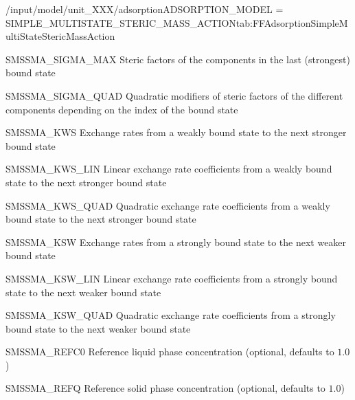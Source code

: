 \begin{condsubgroup}{/input/model/unit\_XXX/adsorption}{ADSORPTION\_MODEL = SIMPLE\_MULTISTATE\_STERIC\_MASS\_ACTION}{tab:FFAdsorptionSimpleMultiStateStericMassAction}
  \begin{dataset}[type = double, range={$\geq 0$}, length={\texttt{NCOMP}}]{SMSSMA\_SIGMA\_MAX} 
    Steric factors of the components in the last (strongest) bound state
  \end{dataset} 
  \begin{dataset}[type = double, range={$\mathds{R}$}, length={\texttt{NCOMP}}]{SMSSMA\_SIGMA\_QUAD} 
    Quadratic modifiers of steric factors of the different components depending on the index of the bound state
  \end{dataset} 
  \begin{dataset}[unit=\si{\per\second}, type = double, range={$\geq 0$}, length={\texttt{NCOMP}}]{SMSSMA\_KWS} 
    Exchange rates from a weakly bound state to the next stronger bound state
  \end{dataset} 
  \begin{dataset}[unit=\si{\per\second}, type = double, range={$\mathds{R}$}, length={\texttt{NCOMP}}]{SMSSMA\_KWS\_LIN} 
    Linear exchange rate coefficients from a weakly bound state to the next stronger bound state
  \end{dataset} 
  \begin{dataset}[unit=\si{\per\second}, type = double, range={$\mathds{R}$}, length={\texttt{NCOMP}}]{SMSSMA\_KWS\_QUAD} 
    Quadratic exchange rate coefficients from a weakly bound state to the next stronger bound state
  \end{dataset} 
  \begin{dataset}[unit=\si{\per\second}, type = double, range={$\geq 0$}, length={\texttt{NCOMP}}]{SMSSMA\_KSW} 
    Exchange rates from a strongly bound state to the next weaker bound state
  \end{dataset} 
  \begin{dataset}[unit=\si{\per\second}, type = double, range={$\mathds{R}$}, length={\texttt{NCOMP}}]{SMSSMA\_KSW\_LIN} 
    Linear exchange rate coefficients from a strongly bound state to the next weaker bound state
  \end{dataset} 
  \begin{dataset}[unit=\si{\per\second}, type = double, range={$\mathds{R}$}, length={\texttt{NCOMP}}]{SMSSMA\_KSW\_QUAD} 
    Quadratic exchange rate coefficients from a strongly bound state to the next weaker bound state
  \end{dataset} 
  \begin{dataset}[unit=\si{\mol\per\raiseto{3}\metre\of{MP}}, type = double, range={$> 0$}, length={1}]{SMSSMA\_REFC0} 
    Reference liquid phase concentration (optional, defaults to $1.0$) 
  \end{dataset} 
  \begin{dataset}[unit=\si{\mol\per\raiseto{3}\metre\of{SP}}, type = double, range={$> 0$}, length={1}]{SMSSMA\_REFQ} 
    Reference solid phase concentration (optional, defaults to $1.0$)
  \end{dataset} 
\end{condsubgroup}

